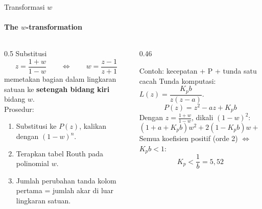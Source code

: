 \documentclass[aspectratio=169,10pt]{beamer}
\begin{document}
\begin{frame}{Transformasi $w$}
	\framesubtitle{The $w$-transformation}
	\begin{columns}[T]
		\begin{column}{0.5\textwidth}
			\small
			Substitusi
			\[
				z = \frac{1+w}{1-w}\qquad\Longleftrightarrow\qquad w = \frac{z-1}{z+1}
			\]
			memetakan bagian dalam lingkaran satuan ke \textbf{setengah bidang kiri} bidang $w$.\\[4pt]
			Prosedur:
			\begin{enumerate}
				\item Substitusi ke $P(z)$, kalikan dengan $(1-w)^n$.
				\item Terapkan tabel Routh pada polinomial $w$.
				\item Jumlah perubahan tanda kolom pertama = jumlah akar di luar lingkaran satuan.
			\end{enumerate}
		\end{column}
		\begin{column}{0.46\textwidth}
			\begin{exampleblock}{Contoh: kecepatan + P + tunda satu cacah}
				\small
				Tunda komputasi: $L(z) = \dfrac{K_pb}{z(z-a)}$.
				\[
					P(z) = z^2 - az + K_pb
				\]
				Dengan $z = \frac{1+w}{1-w}$, dikali $(1-w)^2$:
				\[
					(1+a+K_pb)w^2 + 2(1-K_pb)w + (1-a+K_pb)
				\]
				Semua koefisien positif (orde 2) $\iff$ $K_pb < 1$:
				\[
					K_p < \frac{1}{b} = 5{,}52
				\]
			\end{exampleblock}
		\end{column}
	\end{columns}
\end{frame}
\end{document}
